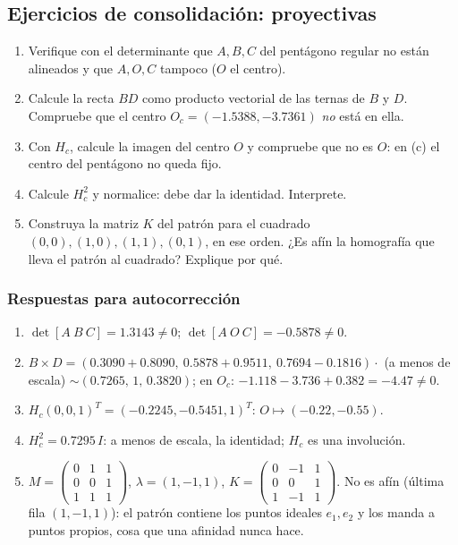 \subsection{Ejercicios de consolidación: proyectivas}

\begin{enumerate}
  \item Verifique con el determinante que \(A,B,C\) del pentágono regular no están alineados
  y que \(A,O,C\) tampoco (\(O\) el centro).
  \item Calcule la recta \(BD\) como producto vectorial de las ternas de \(B\) y \(D\).
  Compruebe que el centro \(O_c=(-1.5388,-3.7361)\) \emph{no} está en ella.
  \item Con \(H_c\), calcule la imagen del centro \(O\) y compruebe que no es \(O\): en
  (c) el centro del pentágono no queda fijo.
  \item Calcule \(H_c^2\) y normalice: debe dar la identidad. Interprete.
  \item Construya la matriz \(K\) del patrón para el cuadrado \((0,0),(1,0),(1,1),(0,1)\),
  en ese orden. ¿Es afín la homografía que lleva el patrón al cuadrado? Explique por qué.
\end{enumerate}

\subsubsection{Respuestas para autocorrección}
\begin{enumerate}
  \item \(\det[A\ B\ C]=1.3143\neq0\); \(\det[A\ O\ C]=-0.5878\neq0\).
  \item \(B\times D=(0.3090+0.8090,\ 0.5878+0.9511,\ 0.7694-0.1816)\cdot\) (a menos de
  escala) \(\sim(0.7265,\,1,\,0.3820)\); en \(O_c\): \(-1.118-3.736+0.382=-4.47\neq0\).
  \item \(H_c(0,0,1)^T=(-0.2245,-0.5451,1)^T\): \(O\mapsto(-0.22,-0.55)\).
  \item \(H_c^2=0.7295\,I\): a menos de escala, la identidad; \(H_c\) es una involución.
  \item \(M=\begin{pmatrix}0&1&1\\0&0&1\\1&1&1\end{pmatrix}\), \(\lambda=(1,-1,1)\),
  \(K=\begin{pmatrix}0&-1&1\\0&0&1\\1&-1&1\end{pmatrix}\). No es afín (última fila
  \((1,-1,1)\)): el patrón contiene los puntos ideales \(e_1,e_2\) y los manda a puntos
  propios, cosa que una afinidad nunca hace.
\end{enumerate}


